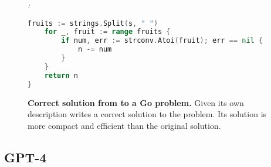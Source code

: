 \begin{figure}[htbp]
\emph{\model{}:}

\hrulefill

\begin{lstlisting}[language=Go,breaklines=true,basicstyle=\ttfamily\scriptsize]
	fruits := strings.Split(s, " ")
	for _, fruit := range fruits {
		if num, err := strconv.Atoi(fruit); err == nil {
			n -= num
		}
	}
	return n
}
\end{lstlisting}

\hrulefill

\caption{\textbf{Correct solution from \model{} to a \evale{} Go problem.} Given its own description \model{} writes a correct solution to the problem. Its solution is more compact and efficient than the original solution.}
\label{fig:modelgo}
\end{figure}





\FloatBarrier



\subsection{GPT-4}
\label{sec:examplesgpt4}

